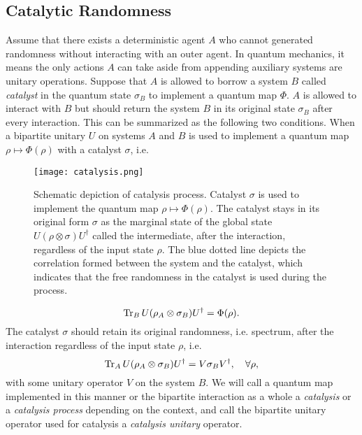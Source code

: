 \documentclass[aps, reprint, amsmath,amssymb, prx, superscriptaddress]{revtex4-2}
\begin{document}
\subsection{Catalytic Randomness}\label{subsec:catran}



 Assume that there exists a deterministic agent $A$ who cannot generated randomness without interacting with an outer agent. In quantum mechanics, it means the only actions $A$ can take aside from appending auxiliary systems are unitary operations. Suppose that $A$ is allowed to borrow a system $B$ called \textit{catalyst} in the quantum state $\sigma_B$ to implement a quantum map $\Phi$. $A$ is allowed to interact with $B$ but should return the system $B$ in its original state $\sigma_B$ after every interaction. This can be summarized as the following two conditions. When a bipartite unitary $U$ on systems $A$ and $B$ is used to implement a quantum map $\rho \mapsto \Phi(\rho)$ with a catalyst $\sigma$, i.e.
 
 \begin{figure}[t]
    \texttt{[image: catalysis.png]}
    \caption{Schematic depiction of catalysis process. Catalyst $\sigma$ is used to implement the quantum map $\rho \mapsto \Phi(\rho)$.  The catalyst stays in its original form $\sigma$ as the marginal state of the global state $U(\rho\otimes\sigma)U^\dag$ called the intermediate, after the interaction, regardless of the input state $\rho$. The blue dotted line depicts the correlation formed between the system and the catalyst, which indicates that the free randomness in the catalyst is used during the process.}\label{fig:catalysis}
\end{figure}
 

\begin{equation}
    \Tr_B U(\rho_{A} \otimes \sigma_{B})U^\dag = \Phi(\rho).
\end{equation}
The catalyst $\sigma$ should retain its original randomness, i.e. spectrum, after the interaction regardless of the input state $\rho$, i.e.
\begin{equation} \label{eqn:catal}
    \Tr_A U(\rho_{A} \otimes \sigma_{B})U^\dag = V\sigma_{B}V^\dag, \quad\forall \rho,
\end{equation}
with some unitary operator $V$ on the system $B$. We will call a quantum map implemented in this manner or the bipartite interaction as a whole a \textit{catalysis} or a \textit{catalysis process} depending on the context, and call the bipartite unitary operator used for catalysis a \textit{catalysis unitary} operator.
\end{document}

